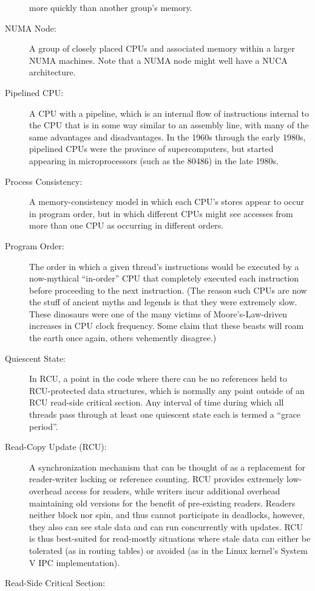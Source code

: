 \begin{description}
	more quickly than another group's memory.
\item[NUMA Node:]
	A group of closely placed CPUs and associated memory within
	a larger NUMA machines.
	Note that a NUMA node might well have a NUCA architecture.
\item[Pipelined CPU:]
	A CPU with a pipeline, which is
	an internal flow of instructions internal to the CPU that
	is in some way similar to an assembly line, with many of
	the same advantages and disadvantages.
	In the 1960s through the early 1980s, pipelined CPUs were the
	province of supercomputers, but started appearing in microprocessors
	(such as the 80486) in the late 1980s.
\item[Process Consistency:]
	A memory-consistency model in which each CPU's stores appear to
	occur in program order, but in which different CPUs might see
	accesses from more than one CPU as occurring in different orders.
\item[Program Order:]
	The order in which a given thread's instructions
	would be executed by a now-mythical ``in-order'' CPU that
	completely executed each instruction before proceeding to
	the next instruction.
	(The reason such CPUs are now the stuff of ancient myths
	and legends is that they were extremely slow.
	These dinosaurs were one of the many victims of
	Moore's-Law-driven increases in CPU clock frequency.
	Some claim that these beasts will roam the earth once again,
	others vehemently disagree.)
\item[Quiescent State:]
	In RCU, a point in the code where there can be no references held
	to RCU-protected data structures, which is normally any point
	outside of an RCU read-side critical section.
	Any interval of time during which all threads pass through at
	least one quiescent state each is termed a ``grace period''.
\item[Read-Copy Update (RCU):]
	A synchronization mechanism that can be thought of as a replacement
	for reader-writer locking or reference counting.
	RCU provides extremely low-overhead access for readers, while
	writers incur additional overhead maintaining old versions
	for the benefit of pre-existing readers.
	Readers neither block nor spin, and thus cannot participate in
	deadlocks, however, they also can see stale data and can
	run concurrently with updates.
	RCU is thus best-suited for read-mostly situations where
	stale data can either be tolerated (as in routing tables)
	or avoided (as in the Linux kernel's System V IPC implementation).
\item[Read-Side Critical Section:]

\end{description}

